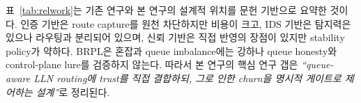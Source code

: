 \documentclass[10pt,a4paper,twocolumn]{article}
\begin{document}
\begin{table}[!t]
\centering\small
\caption{RPL 보안 방어 계열의 문헌 기반 정성 위치 비교
  (qualitative positioning; O: 충족, P: 부분, X: 미충족).
  표의 목적은 설계 축에서의 상대적 위치를 요약하는 것이며,
  RFTrust/PCC-RPL 등과의 실험적 성능 비교를 의미하지 않는다.}
\label{tab:relwork}
\end{table}

\noindent
표~\ref{tab:relwork}는 기존 연구와 본 연구의 설계적 위치를
문헌 기반으로 요약한 것이다.
인증 기반은 route capture를 원천 차단하지만 비용이 크고,
IDS 기반은 탐지력은 있으나 라우팅과 분리되어 있으며,
신뢰 기반은 직접 반영의 장점이 있지만 stability policy가 약하다.
BRPL은 혼잡과 queue imbalance에는 강하나
queue honesty와 control-plane lure를 검증하지 않는다.
따라서 본 연구의 핵심 연구 갭은
\emph{``queue-aware LLN routing에 trust를 직접 결합하되,
그로 인한 churn을 명시적 게이트로 제어하는 설계''}로 정리된다.
\end{document}
